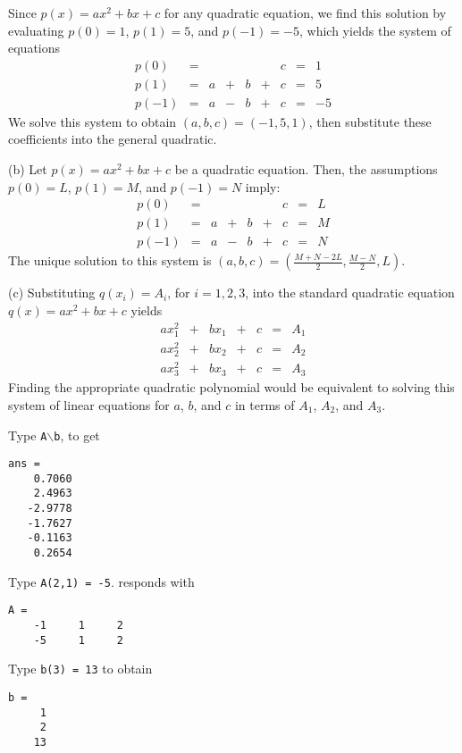 \documentclass{ximera}
\begin{document}
\soln Since $p(x) = ax^2 + bx + c$ for any quadratic equation, we find
this solution by evaluating $p(0) = 1$, $p(1) = 5$, and $p(-1) = -5$,
which yields the system of equations
\[
\begin{array}{lrrrrrrrr}
p(0) & = & & & & & c & = & 1 \\
p(1) & = & a & + & b & + & c & = & 5 \\
p(-1) & = & a & - & b & + & c & = & -5\end{array}
\]
We solve this system to obtain $(a,b,c) = (-1,5,1)$, then substitute
these coefficients into the general quadratic.

(b) Let $p(x) = ax^2 + bx + c$ be a quadratic equation.  Then, the
assumptions $p(0) = L$, $p(1) = M$, and $p(-1) = N$ imply:
\[
\begin{array}{lrrrrrrrr}
p(0) & = & & & & & c & = & L \\
p(1) & = & a & + & b & + & c & = & M \\
p(-1) & = & a & - & b & + & c & = & N\end{array}
\]
The unique solution to this system is $(a,b,c) =
(\frac{M + N - 2L}{2},\frac{M - N}{2},L)$.

(c) Substituting $q(x_i) = A_i$, for $i = 1,2,3$, into the standard
quadratic equation $q(x) = ax^2 + bx + c$ yields
\[
\begin{array}{ccccccc}
ax_1^2 & + & bx_1 & + & c & = & A_1 \\
ax_2^2 & + & bx_2 & + & c & = & A_2 \\
ax_3^2 & + & bx_3 & + & c & = & A_3\end{array}
\]
Finding the appropriate quadratic polynomial would be equivalent to
solving this system of linear equations for $a$, $b$, and $c$ in
terms of $A_1$, $A_2$, and $A_3$.




Type {\tt A}$\backslash${\tt b}, to get
\begin{verbatim}
ans =
    0.7060
    2.4963
   -2.9778
   -1.7627
   -0.1163
    0.2654
\end{verbatim}

 Type {\tt A(2,1) = -5}.  \Matlab responds with
\begin{verbatim}
A =
    -1     1     2
    -5     1     2
\end{verbatim}

\newpage
{} Type {\tt b(3) = 13} to obtain
\begin{verbatim}
b =
     1
     2
    13
\end{verbatim}
\end{document}
